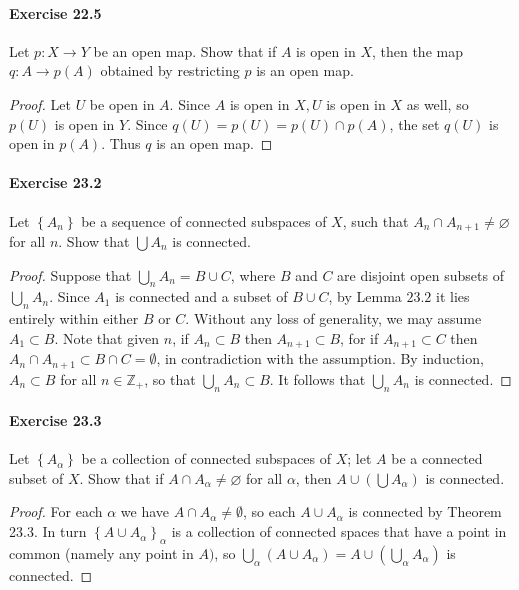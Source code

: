 \documentclass{article}
\begin{document}
\paragraph{Exercise 22.5} Let $p \colon X \rightarrow Y$ be an open map. Show that if $A$ is open in $X$, then the map $q \colon A \rightarrow p(A)$ obtained by restricting $p$ is an open map.
\begin{proof}
Let $U$ be open in $A$. Since $A$ is open in $X, U$ is open in $X$ as well, so $p(U)$ is open in $Y$. Since $q(U)=p(U)=p(U) \cap p(A)$, the set $q(U)$ is open in $p(A)$. Thus $q$ is an open map.
\end{proof}



\paragraph{Exercise 23.2} Let $\left\{A_{n}\right\}$ be a sequence of connected subspaces of $X$, such that $A_{n} \cap A_{n+1} \neq \varnothing$ for all $n$. Show that $\bigcup A_{n}$ is connected.
\begin{proof}
    Suppose that $\bigcup_n A_n=B \cup C$, where $B$ and $C$ are disjoint open subsets of $\bigcup_n A_n$. Since $A_1$ is connected and a subset of $B \cup C$, by Lemma $23.2$ it lies entirely within either $B$ or $C$. Without any loss of generality, we may assume $A_1 \subset B$. Note that given $n$, if $A_n \subset B$ then $A_{n+1} \subset B$, for if $A_{n+1} \subset C$ then $A_n \cap A_{n+1} \subset B \cap C=\emptyset$, in contradiction with the assumption. By induction, $A_n \subset B$ for all $n \in \mathbb{Z}_{+}$, so that $\bigcup_n A_n \subset B$. It follows that $\bigcup_n A_n$ is connected.
\end{proof}



\paragraph{Exercise 23.3} Let $\left\{A_{\alpha}\right\}$ be a collection of connected subspaces of $X$; let $A$ be a connected subset of $X$. Show that if $A \cap A_{\alpha} \neq \varnothing$ for all $\alpha$, then $A \cup\left(\bigcup A_{\alpha}\right)$ is connected.
\begin{proof}
    For each $\alpha$ we have $A \cap A_\alpha \neq \emptyset$, so each $A \cup A_\alpha$ is connected by Theorem 23.3. In turn $\left\{A \cup A_\alpha\right\}_\alpha$ is a collection of connected spaces that have a point in common (namely any point in $A)$, so $\bigcup_\alpha\left(A \cup A_\alpha\right)=A \cup\left(\bigcup_\alpha A_\alpha\right)$ is connected. 
\end{proof}
\end{document}
